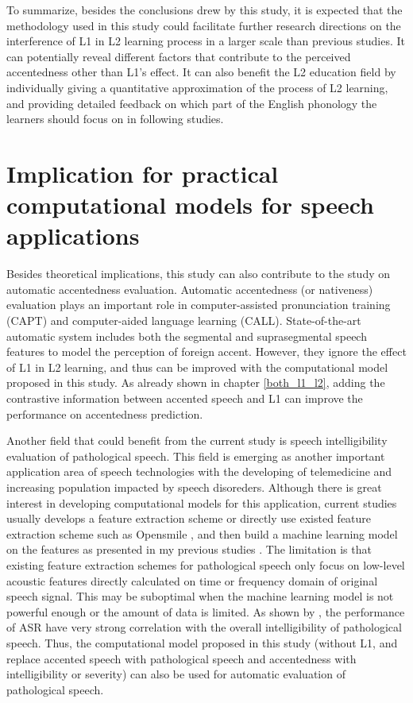 To summarize, besides the conclusions drew by this study, it is expected that the methodology used in this study could facilitate further research directions on the interference of L1 in L2 learning process in a larger scale than previous studies. It can potentially reveal different factors that contribute to the perceived accentedness other than L1's effect. It can also benefit the L2 education field by individually giving a quantitative approximation of the process of L2 learning, and providing detailed feedback on which part of the English phonology the learners should focus on in following studies.

\section{Implication for practical computational models for speech applications}

Besides theoretical implications, this study can also contribute to the study on automatic accentedness evaluation. Automatic accentedness (or nativeness) evaluation plays an important role in computer-assisted pronunciation training (CAPT) and computer-aided language learning (CALL). State-of-the-art automatic system includes both the segmental and suprasegmental speech features to model the perception of foreign accent. However, they ignore the effect of L1 in L2 learning, and thus can be improved with the computational model proposed in this study. As already shown in chapter \ref{both_l1_l2}, adding the contrastive information between accented speech and L1 can improve the performance on accentedness prediction.

Another field that could benefit from the current study is speech intelligibility evaluation of pathological speech. This field is emerging as another important application area of speech technologies with the developing of telemedicine and increasing population impacted by speech disoreders. Although there is great interest in developing computational models for this application, current studies usually develops a feature extraction scheme or directly use existed feature extraction scheme such as Opensmile \citep{eyben2010opensmile}, and then build a machine learning model on the features as presented in my previous studies \citep{tu2016models,tu2017interpretable,tu2017objective}. The limitation is that existing feature extraction schemes for pathological speech only focus on low-level acoustic features directly calculated on time or frequency domain of original speech signal. This may be suboptimal when the machine learning model is not powerful enough or the amount of data is limited. As shown by \cite{tu2016relationship}, the performance of ASR have very strong correlation with the overall intelligibility of pathological speech. Thus, the computational model proposed in this study (without L1, and replace accented speech with pathological speech and accentedness with intelligibility or severity) can also be used for automatic evaluation of pathological speech.

